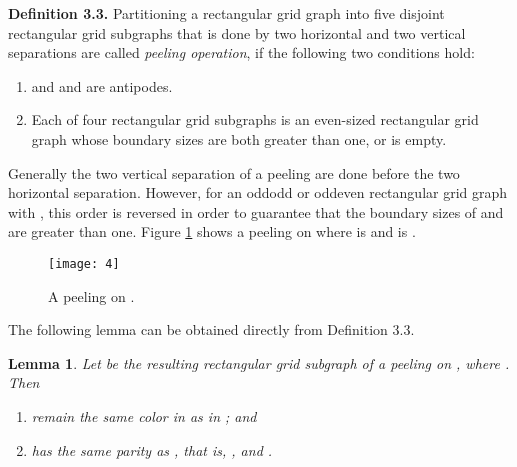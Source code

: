\documentclass[preprint,12pt]{elsarticle}
\newtheorem{lem}{Lemma}[section]
\begin{document}
\noindent\textbf{Definition 3.3.} \cite{CST:AFAFCHPIM} Partitioning
a rectangular grid graph  into five disjoint rectangular grid
subgraphs  that is done by two horizontal and two
vertical separations are called \textit{peeling operation}, if the following two conditions hold:
\begin{enumerate}
\item  and  and  are antipodes.
\item  Each of four rectangular grid subgraphs  is an
even-sized rectangular grid graph whose boundary sizes are both
greater than one, or is empty.
\end{enumerate}
Generally the two vertical separation of a peeling are done before
the two horizontal separation. However, for an oddodd or
oddeven rectangular grid graph with , this
order is reversed in order to guarantee that the boundary sizes of
 and  are greater than one. Figure
\ref{a} shows a peeling on  where  is  and  is .\\
\begin{figure}[htb]
  \centering
  \texttt{[image: 4]}
  \caption[]{\small A peeling on .}
  \label{a}
\end{figure}
The following lemma can be obtained directly from Definition 3.3.
\begin{lem} \label{Lemma:5} \cite{CST:AFAFCHPIM}
Let  be the resulting rectangular grid subgraph
of a peeling on , where . Then
\begin{enumerate}
\item  remain the same color in  as in ; and
\item  has the same parity as , that is, , and .
\end{enumerate}
\end{lem}
\end{document}
